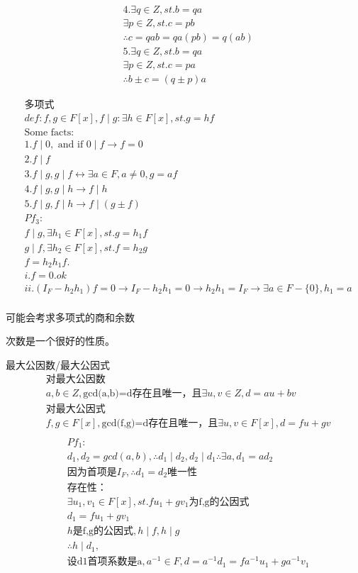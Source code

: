 \documentclass[12pt, a4paper]{article}  %
\begin{document}
\begin{align}
    &4.\exists q\in Z,st. b=qa\\
    &\exists p\in Z,st. c=pb\\
    &\therefore c=qab=qa(pb)=q(ab)\\
    &5.\exists q\in Z,st. b=qa\\
    &\exists p\in Z,st. c=pa\\
    &\therefore b\pm c=(q\pm p)a
\end{align}

\begin{align}
    &\text{多项式}\\
    &def:f,g\in F[x],f\mid g:\exists h\in F[x],st. g=hf\\
    &\text{Some facts:}\\
    &1.f\mid 0,\text{ and if }0\mid f\rightarrow f=0\\
    &2.f\mid f\\
    &3.f\mid g,g\mid f\leftrightarrow \exists a\in F,a\neq 0,g=af\\
    &4.f\mid g,g\mid h\rightarrow f\mid h\\
    &5.f\mid g,f\mid h\rightarrow f\mid (g\pm f)\\
    &Pf_3:\\
    &f\mid g,\exists h_1\in F[x],st. g=h_1f\\
    &g\mid f,\exists h_2\in F[x],st. f=h_2g\\
    &f=h_2h_1f.\\
    &i.f=0.ok\\
    &ii.(I_F-h_2h_1)f=0\rightarrow I_F-h_2h_1=0\rightarrow h_2h_1=I_F\rightarrow \exists a\in F-\{0\},h_1=a\\
\end{align}

可能会考求多项式的商和余数

次数是一个很好的性质。

最大公因数/最大公因式
\begin{align}
    &\text{对最大公因数}\\
    &a,b\in Z,\text{gcd(a,b)=d存在且唯一，且}\exists u,v\in Z,d=au+bv\\
    &\text{对最大公因式}\\
    &f,g\in F[x],\text{gcd(f,g)=d存在且唯一，且}\exists u,v\in F[x],d=fu+gv\\
\end{align}
\begin{align}
    &Pf_1:\\
    &d_1,d_2=gcd(a,b),\therefore d_1\mid d_2,d_2\mid d_1\therefore \exists a,d_1=ad_2\\
    &\text{因为首项是}I_F,\therefore d_1=d_2\text{唯一性}\\
    &\text{存在性：}\\
    &\exists u_1,v_1\in F[x],st. fu_1+gv_1\text{为f,g的公因式}\\
    &d_1=fu_1+gv_1\\
    &h\text{是f,g的公因式},h\mid f,h\mid g\\
    &\therefore h\mid d_1,\\
    &\text{设d1首项系数是a},a^{-1}\in F,d=a^{-1}d_1=fa^{-1}u_1+ga^{-1}v_1\\
\end{align}
\end{document}
